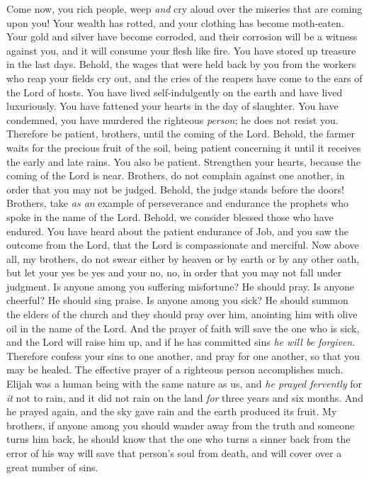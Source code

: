 \begin{biblechapter} %
 Come now, you rich people, weep \textit{and} cry aloud over the miseries that are coming upon you!
\verse Your wealth has rotted, and your clothing has become moth-eaten.
\verse Your gold and silver have become corroded, and their corrosion will be a witness against you, and it will consume your flesh like fire. You have stored up treasure in the last days.
\verse Behold, the wages that were held back by you from the workers who reap your fields cry out, and the cries of the reapers have come to the ears of the Lord of hosts.
\verse You have lived self-indulgently on the earth and have lived luxuriously. You have fattened your hearts in the day of slaughter.
\verse You have condemned, you have murdered the righteous \textit{person}; he does not resist you.
 Therefore be patient, brothers, until the coming of the Lord. Behold, the farmer waits for the precious fruit of the soil, being patient concerning it until it receives the early and late rains.
\verse You also be patient. Strengthen your hearts, because the coming of the Lord is near.
\verse Brothers, do not complain against one another, in order that you may not be judged. Behold, the judge stands before the doors!
\verse Brothers, take \textit{as an} example of perseverance and endurance the prophets who spoke in the name of the Lord.
\verse Behold, we consider blessed those who have endured. You have heard about the patient endurance of Job, and you saw the outcome from the Lord, that the Lord is compassionate and merciful.
\verse Now above all, my brothers, do not swear either by heaven or by earth or by any other oath, but let your yes be yes and your no, no, in order that you may not fall under judgment.
 Is anyone among you suffering misfortune? He should pray. Is anyone cheerful? He should sing praise.
\verse Is anyone among you sick? He should summon the elders of the church and they should pray over him, anointing him with olive oil in the name of the Lord.
\verse And the prayer of faith will save the one who is sick, and the Lord will raise him up, and if he has committed sins \textit{he will be forgiven}.
\verse Therefore confess your sins to one another, and pray for one another, so that you may be healed. The effective prayer of a righteous person accomplishes much.
\verse Elijah was a human being with the same nature as us, and \textit{he prayed fervently} for \textit{it} not to rain, and it did not rain on the land \textit{for} three years and six months.
\verse And he prayed again, and the sky gave rain and the earth produced its fruit.
\verse My brothers, if anyone among you should wander away from the truth and someone turns him back,
\verse he should know that the one who turns a sinner back from the error of his way will save that person’s soul from death, and will cover over a great number of sins.
\end{biblechapter}

